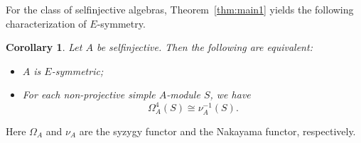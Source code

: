 \documentclass[12pt,reqno]{amsart}
\newtheorem{Cor}[Thm]{Corollary}
\theoremstyle{definition}
\begin{document}


For the class of selfinjective algebras, Theorem~\ref{thm:main1}
yields the following characterization of $E$-symmetry.

\begin{Cor}\label{cor:main2}
Let $A$ be selfinjective.
Then the following are equivalent:
\begin{itemize}\itemsep2mm

\item[(i)]
$A$ is $E$-symmetric;

\item[(ii)]
For each non-projective simple $A$-module $S$, we have
$$
\Omega_A^4(S) \cong \nu_A^{-1}(S).
$$

\end{itemize}
\end{Cor}

Here 
$\Omega_A$ and $\nu_A$
are the syzygy functor and the Nakayama functor, respectively.
\end{document}
